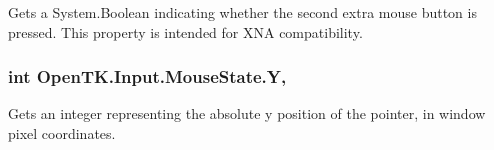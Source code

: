 Gets a System.\-Boolean indicating whether the second extra mouse button is pressed. This property is intended for X\-N\-A compatibility. 

\hypertarget{struct_open_t_k_1_1_input_1_1_mouse_state_a768bb7145134c4f4c7381e91f4b59744}{
\subsubsection[{Y}]{\setlength{\rightskip}{0pt plus 5cm}int Open\-T\-K.\-Input.\-Mouse\-State.\-Y\hspace{0.3cm}{\ttfamily [get]}, {\ttfamily [set]}}}\label{struct_open_t_k_1_1_input_1_1_mouse_state_a768bb7145134c4f4c7381e91f4b59744}


Gets an integer representing the absolute y position of the pointer, in window pixel coordinates. 

